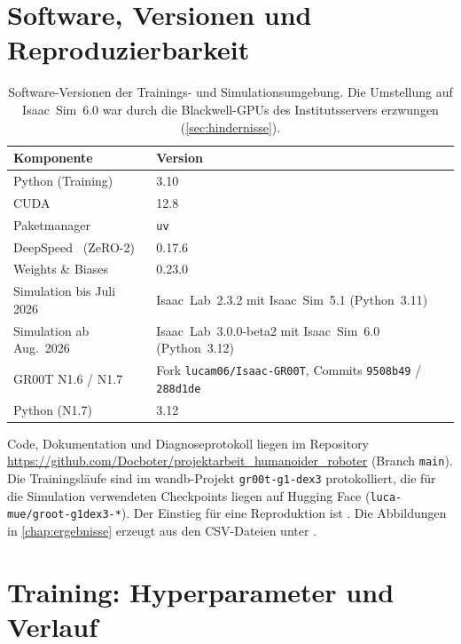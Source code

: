 \chapter{Software, Versionen und Reproduzierbarkeit}
\label{anh:software}

\begin{table}[htb]
  \centering
  \begin{tabular}{ll}
    \toprule
    Komponente       & Version \\
    \midrule
    Python (Training)         & 3.10 \\
    CUDA                      & 12.8 \\
    Paketmanager              & \texttt{uv} \\
    DeepSpeed~\cite{zero2020} (ZeRO-2) & 0.17.6 \\
    Weights \& Biases         & 0.23.0 \\
    Simulation bis Juli 2026  & Isaac~Lab~2.3.2 mit Isaac~Sim~5.1 (Python~3.11) \\
    Simulation ab Aug.\ 2026  & Isaac~Lab~3.0.0-beta2 mit Isaac~Sim~6.0 (Python~3.12) \\
    GR00T N1.6 / N1.7         & Fork \texttt{lucam06/Isaac-GR00T}, Commits \texttt{9508b49} / \texttt{288d1de} \\
    Python (N1.7)             & 3.12 \\
    \bottomrule
  \end{tabular}
  \caption[Software-Versionen der Trainings- und Simulationsumgebung]{Software-Versionen der Trainings- und Simulationsumgebung. Die
    Umstellung auf Isaac~Sim~6.0 war durch die Blackwell-GPUs des
    Institutsservers erzwungen (\cref{sec:hindernisse}).}
  \label{tab:anh-software}
\end{table}

Code, Dokumentation und Diagnoseprotokoll liegen im Repository
\url{https://github.com/Docboter/projektarbeit_humanoider_roboter}
(Branch \texttt{main}). Die Trainingsläufe sind im \ac{wandb}-Projekt
\texttt{gr00t-g1-dex3} protokolliert, die für die Simulation verwendeten
Checkpoints liegen auf Hugging Face (\texttt{luca-mue/groot-g1dex3-*}). Der Einstieg für eine Reproduktion ist . Die
Abbildungen in \cref{chap:ergebnisse} erzeugt  aus den
CSV-Dateien unter .

\chapter{Training: Hyperparameter und Verlauf}
\label{anh:trainingsdynamik}
\label{anh:training}

